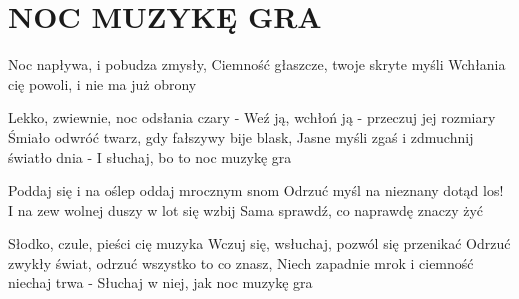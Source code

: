 \documentclass[../../../songbook.tex]{subfiles}
\begin{document}
\TabPositions{8cm} %
\section*{NOC MUZYKĘ GRA}
{}
\vspace{0.5cm}
Noc napływa, i pobudza zmysły,	 \newline
Ciemność głaszcze, twoje skryte myśli			 \newline
Wchłania cię powoli, i nie ma już obrony		 \newline

Lekko, zwiewnie, noc odsłania czary -			 \newline
Weź ją, wchłoń ją - przeczuj jej rozmiary			 \newline
Śmiało odwróć twarz, gdy fałszywy bije blask,	 \newline
Jasne myśli zgaś i zdmuchnij światło dnia -		 \newline
I słuchaj, bo to noc muzykę gra				 \newline

\-\hspace{0.5cm} Poddaj się i na oślep oddaj mrocznym snom	 \newline
\-\hspace{0.5cm} Odrzuć myśl na nieznany dotąd los!	       \newline
\-\hspace{0.5cm} I na zew wolnej duszy w lot się wzbij        \newline
\-\hspace{0.5cm} Sama sprawdź, co naprawdę znaczy żyć          \newline

Słodko, czule, pieści cię muzyka				 \newline
Wczuj się, wsłuchaj, pozwól się przenikać				 \newline
Odrzuć zwykły świat, odrzuć wszystko to co znasz,		 \newline
Niech zapadnie mrok i ciemność niechaj trwa -	 \newline
Słuchaj w niej, jak noc muzykę gra				 \newline
\end{document}

